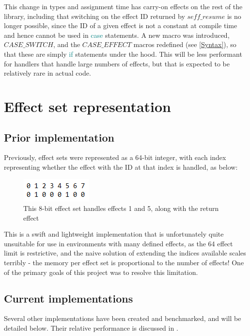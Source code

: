 \documentclass[logo,bsc,singlespacing,parskip,online]{infthesis}
\begin{document}
This change in types and assignment time has carry-on effects on the rest of the library, including that switching on the effect ID returned by $seff\_resume$ is no longer possible, since the ID of a given effect is not a constant at compile time and hence cannot be used in \textcolor{teal}{case} statements. A new macro was introduced, $CASE\_SWITCH$, and the $CASE\_EFFECT$ macros redefined (see \cref{Syntax}), so that these are simply \textcolor{teal}{if} statements under the hood. This will be less performant for handlers that handle large numbers of effects, but that is expected to be relatively rare in actual code.

\section{Effect set representation}

\subsection{Prior implementation}

Previously, effect sets were represented as a 64-bit integer, with each index representing whether the effect with the ID at that index is handled, as below:

\begin{figure}[ht]
    \centering
    \includegraphics[width=0.3\linewidth]{effect_set.png}
    \caption{This 8-bit effect set handles effects 1 and 5, along with the return effect}
\end{figure}

This is a swift and lightweight implementation that is unfortunately quite unsuitable for use in environments with many defined effects, as the 64 effect limit is restrictive, and the naive solution of extending the indices available scales terribly - the memory per effect set is proportional to the number of effects! One of the primary goals of this project was to resolve this limitation.

\subsection{Current implementations} \label{impls_here}

Several other implementations have been created and benchmarked, and will be detailed below. Their relative performance is discussed in .
\end{document}
